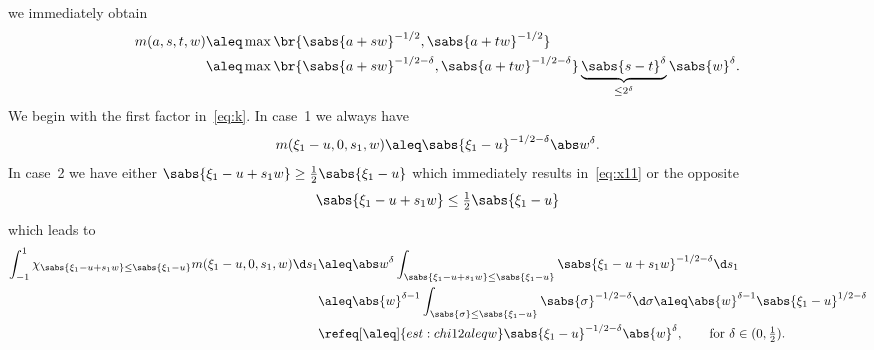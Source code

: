 we immediately obtain
\begin{align}
  m(a,s,t,w)
  &\aleq \max\br{\sabs{a+sw}^{-1/2},\sabs{a+tw}^{-1/2}} \nonumber\\
  &\aleq \max\br{\sabs{a+sw}^{-1/2-\delta},\sabs{a+tw}^{-1/2-\delta}}\underbrace{\sabs{s-t}^\delta}_{\le2^\delta}\sabs{w}^\delta. \label{eq:est:chi2roughest}
\end{align}
We begin with the first factor in~\eqref{eq:k}. In case~1 we always have
\begin{equation}\label{eq:x11}
 m(\xi_1-u,0,s_1,w) \aleq \sabs{\xi_1-u}^{-1/2-\delta}\abs w^\delta.
\end{equation}
In case~2 we have either $\sabs{\xi_1-u+s_1w}\ge\tfrac12\sabs{\xi_1-u}$ which immediately results in~\eqref{eq:x11}
or the opposite
\begin{equation}\label{eq:x11a}
 \sabs{\xi_1-u+s_1w}\le\tfrac12\sabs{\xi_1-u}
\end{equation}
which leads to
\begin{equation}\label{eq:est:intlchi12ds}
 \begin{split}
  \int_{-1}^1 \chi_{\sabs{\xi_1-u+s_1w}\le\sabs{\xi_1-u}}m(\xi_1-u,0,s_1,w)\d s_1
  &\aleq \abs w^\delta \int_{\sabs{\xi_1-u+s_1w}\le\sabs{\xi_1-u}} \sabs{\xi_1-u+s_1w}^{-1/2-\delta}\d s_1 \\
  &\aleq \abs {w}^{\delta-1} \int_{\sabs{\sigma}\le\sabs{\xi_1-u}} \sabs{\sigma}^{-1/2-\delta}\d\sigma 
  \aleq \abs {w}^{\delta-1} \sabs{\xi_1-u}^{1/2-\delta} \\
  &\refeq[\aleq]{est:chi12aleqw} \sabs{\xi_1-u}^{-1/2-\delta}\abs {w}^\delta,\qquad\text{for }\delta\in(0,\tfrac12).
 \end{split}
\end{equation}
